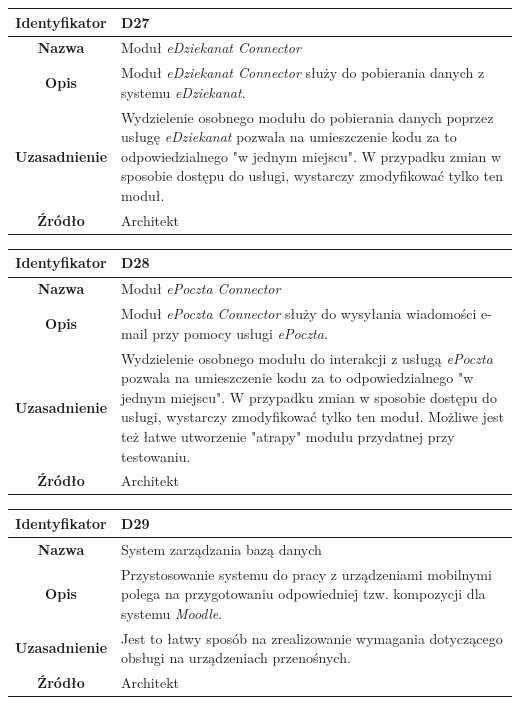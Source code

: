\begin{table}[H]
\centering
\begin{tabular}{ | >{\bfseries}c | p{11cm} | }
\hline
%
Identyfikator & D27 \\ \hline
Nazwa & Moduł \textit{eDziekanat Connector} \\ \hline
Opis & Moduł \textit{eDziekanat Connector} służy do pobierania danych z systemu \textit{eDziekanat}. \\ \hline
Uzasadnienie & Wydzielenie osobnego modułu do pobierania danych poprzez usługę \textit{eDziekanat} pozwala na umieszczenie kodu za to odpowiedzialnego "w jednym miejscu". W przypadku zmian w sposobie dostępu do usługi, wystarczy zmodyfikować tylko ten moduł. \\ \hline
Źródło & Architekt \\ \hline
%
\end{tabular}
\end{table}

\begin{table}[H]
\centering
\begin{tabular}{ | >{\bfseries}c | p{11cm} | }
\hline
%
Identyfikator & D28 \\ \hline
Nazwa & Moduł \textit{ePoczta Connector} \\ \hline
Opis & Moduł \textit{ePoczta Connector} służy do wysyłania wiadomości e-mail przy pomocy usługi \textit{ePoczta}. \\ \hline
Uzasadnienie & Wydzielenie osobnego modułu do interakcji z usługą \textit{ePoczta} pozwala na umieszczenie kodu za to odpowiedzialnego "w jednym miejscu". W przypadku zmian w sposobie dostępu do usługi, wystarczy zmodyfikować tylko ten moduł. Możliwe jest też łatwe utworzenie "atrapy" modułu przydatnej przy testowaniu. \\ \hline
Źródło & Architekt \\ \hline
%
\end{tabular}
\end{table}

\begin{table}[H]
\centering
\begin{tabular}{ | >{\bfseries}c | p{11cm} | }
\hline
%
Identyfikator & D29 \\ \hline
Nazwa & System zarządzania bazą danych \\ \hline
Opis & Przystosowanie systemu do pracy z urządzeniami mobilnymi polega na przygotowaniu odpowiedniej tzw. kompozycji dla systemu \textit{Moodle}. \\ \hline
Uzasadnienie & Jest to łatwy sposób na zrealizowanie wymagania dotyczącego obsługi na urządzeniach przenośnych. \\ \hline
Źródło & Architekt \\ \hline
%
\end{tabular}
\end{table}

